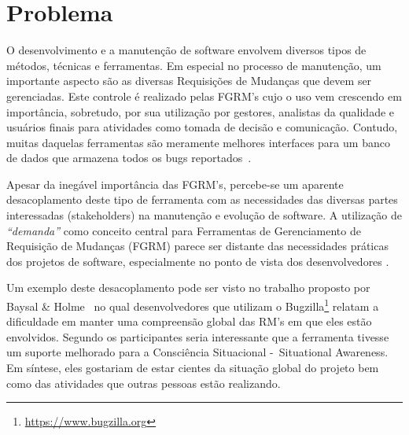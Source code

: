 %


\section{Problema}
\label{sec:intro-problema}


O desenvolvimento e a manutenção de software envolvem diversos tipos de métodos,
técnicas e ferramentas. Em especial no processo de manutenção, um importante
aspecto são as diversas Requisições de Mudanças que devem ser gerenciadas. Este
controle é realizado pelas FGRM's cujo o uso vem crescendo em importância,
sobretudo, por sua utilização por gestores, analistas da qualidade e usuários
finais para atividades como tomada de decisão e comunicação. Contudo, muitas
daquelas ferramentas são meramente melhores interfaces para um banco de dados
que armazena todos os bugs reportados~\cite{zimmermann2009improving}.

Apesar da inegável importância das FGRM's, percebe-se um aparente desacoplamento
deste tipo de ferramenta com as necessidades das diversas partes interessadas
(stakeholders) na manutenção e evolução de software. A utilização de
\textit{``demanda''} como conceito central para Ferramentas de Gerenciamento de
Requisição de Mudanças (FGRM) parece ser distante das necessidades práticas dos
projetos de software, especialmente no ponto de vista dos desenvolvedores
\cite{Baysal:2013:SAP:2486788.2486957}.

Um exemplo deste desacoplamento pode ser visto no trabalho proposto por Baysal
\& Holme~\cite{baysal2012qualitative} no qual desenvolvedores que utilizam o
Bugzilla\footnote{\url{https://www.bugzilla.org}} relatam a dificuldade em
manter uma compreensão global das RM's em que eles estão envolvidos. Segundo os
participantes seria interessante que a ferramenta tivesse um suporte melhorado
para a Consciência Situacional -~Situational Awareness. Em síntese, eles
gostariam de estar cientes da situação global do projeto bem como das atividades
que outras pessoas estão realizando.

